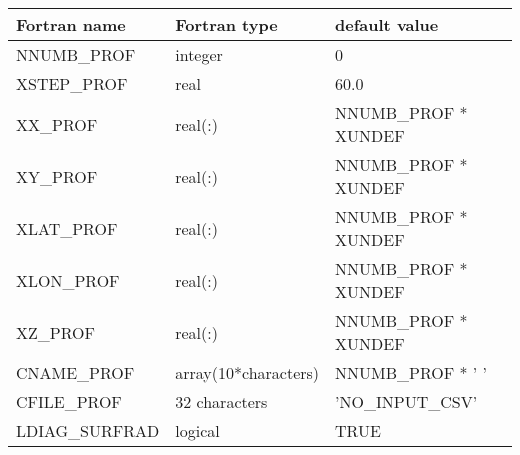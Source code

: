 \vspace{0.5cm}
\begin{longtable} {|p{}|p{}|p{}|}
\hline
Fortran name &  Fortran type & default value \\
\hline
\endhead
\hline
\endfoot
NNUMB\_PROF    & integer &  0 \\
XSTEP\_PROF    & real  &  60.0 \\
XX\_PROF       & real(:)  &  NNUMB\_PROF * XUNDEF \\
XY\_PROF       & real(:)  &  NNUMB\_PROF * XUNDEF  \\
XLAT\_PROF     & real(:)  &  NNUMB\_PROF * XUNDEF \\
XLON\_PROF     & real(:)  &  NNUMB\_PROF * XUNDEF \\
XZ\_PROF       & real(:)  &  NNUMB\_PROF * XUNDEF \\
CNAME\_PROF    & array(10*characters)  &  NNUMB\_PROF * ' ' \\
CFILE\_PROF    & 32 characters  &  'NO\_INPUT\_CSV' \\
LDIAG\_SURFRAD & logical & TRUE \\
\end{longtable}
